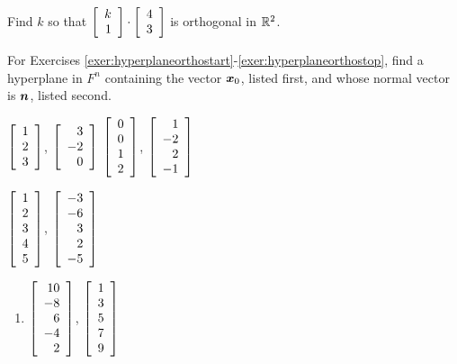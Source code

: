 \begin{enumerate}[!HW!, start=1]
\itemspade Find $k$ so that $\vr{k\\ 1}\cdot \vr{4\\3}$ is orthogonal in $\R^2$.
\end{enumerate}


\noindent For Exercises \ref{exer:hyperplaneorthostart}-\ref{exer:hyperplaneorthostop}, find a hyperplane in $F^n$ containing the vector $\bb x_0$, listed first, and whose normal vector is $\bb n$, listed second.
\begin{enumerate}[!HW!, label=$\spadesuit$ \arabic*., ref=\arabic*]
\begin{multicols}{3}
\item\label{exer:hyperplaneorthostart} $\vr{1\\2\\3}$, $\vr{3\\-2\\0}$ 
\itemspade $\vr{0\\0\\1\\2}$, $\vr{1\\-2\\2\\-1}$
\item\label{exer:hyperplaneorthostop} $\vr{1\\2\\3\\4\\5}$, $\vr{-3\\-6\\3\\2\\-5}$
\end{multicols}
\end{enumerate}
\begin{enumerate}[!HW!]
\item $\vr{10\\-8\\6\\-4\\2}$, $\vr{1\\3\\5\\7\\9}$ %
\end{enumerate}

